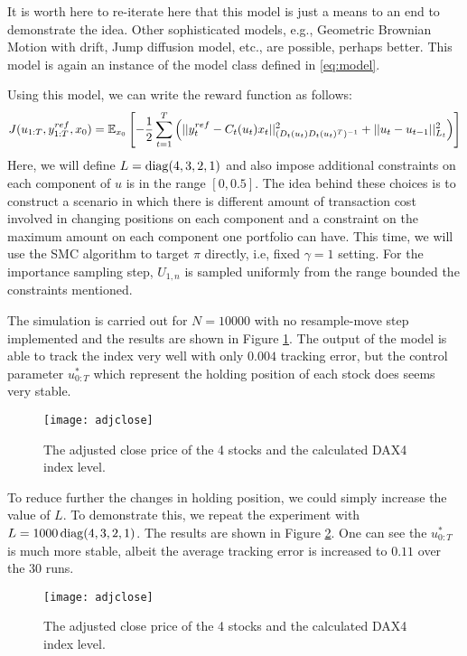 It is worth here to re-iterate here that this model is just a means to an end to demonstrate the idea. Other sophisticated models, e.g., Geometric Brownian Motion with drift, Jump diffusion model, etc., are possible, perhaps better. This model is again an instance of the model class defined in \eqref{eq:model}.

Using this model, we can write the reward function as follows:
\begin{equation}
  J(u_{1:T},y^{ref}_{1:T}, x_0) = \operatorname{\mathbb{E}}_{x_0}\left[ -\dfrac{1}{2}\displaystyle\sum^T_{t=1}\left(\vert\vert y^{ref}_t - C_t(u_t)x_t \vert\vert^2_{(D_t(u_t)D_t(u_t)^T)^{-1}}  + \vert\vert u_t - u_{t-1} \vert\vert^2_{L_t}\right) \right]
\end{equation}
Here, we will define $L = \operatorname{diag}(4,3,2,1)$ and also impose additional constraints on each component of $u$ is in the range $[0,0.5]$. The idea behind these choices is to construct a scenario in which there is different amount of transaction cost involved in changing positions on each component and a constraint on the maximum amount on each component one portfolio can have. This time, we will use the SMC algorithm to target $\pi$ directly, i.e, fixed $\gamma=1$ setting. For the importance sampling step, $U_{1,n}$ is sampled uniformly from the range bounded the constraints mentioned. 

The simulation is carried out for $N=10000$ with no resample-move step implemented and the results are shown in Figure \ref{fig:dax4}. The output of the model is able to track the index very well with only $0.004$ tracking error, but the control parameter $u^*_{0:T}$ which represent the holding position of each stock does seems very stable.

\begin{figure}[htbp]
\centering
\texttt{[image: adjclose]}
\caption{The adjusted close price of the 4 stocks and the calculated DAX4 index level.}
\label{fig:dax4}
\end{figure}

To reduce further the changes in holding position, we could simply increase the value of $L$. To demonstrate this, we repeat the experiment with $L = 1000\operatorname{diag}(4,3,2,1)$. The results are shown in Figure \ref{fig:dax42}. One can see the $u^*_{0:T}$ is much more stable, albeit the average tracking error is increased to $0.11$ over the $30$ runs.

\begin{figure}[htbp]
\centering
\texttt{[image: adjclose]}
\caption{The adjusted close price of the 4 stocks and the calculated DAX4 index level.}
\label{fig:dax42}
\end{figure}

